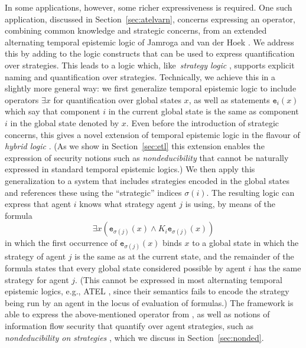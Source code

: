 \documentclass[a4wide]{article}
\theoremstyle{examplesty}
\newcommand{\strat}{\sigma}
\newcommand{\lid}[2]{\mathtt{e}_{#1}(#2)}
\begin{document}
In some 
applications, 
however, some richer expressiveness is required. 
One such application, discussed in Section~\ref{sec:atelvarn},
concerns expressing an operator, combining common knowledge and strategic concerns, 
from an extended alternating temporal epistemic logic of Jamroga and van der Hoek \cite{JvdH2004}.
We address this by 
adding 
to the logic constructs that can be used to express  quantification over strategies.
This leads to a logic which, like~{\em strategy logic} \cite{CHP10,MogaveroMV10}, supports explicit naming and quantification over strategies.
Technically, 
we achieve this in a slightly more general way: we first generalize temporal epistemic logic to include operators 
$\exists x$ for quantification over global states $x$, as well as statements $\lid{i}{x}$ which say that 
component $i$ in the current global state is the same as component $i$ in the global state denoted by $x$. 
Even before the introduction of strategic concerns, this gives a novel extension of temporal epistemic logic 
in the flavour of \emph{hybrid logic} \cite{BS98}. 
(As we show in Section~\ref{sec:etl} this extension enables the expression of 
security notions such as \emph{nondeducibility} \cite{sutherland_86} that cannot be naturally expressed in 
standard temporal epistemic logics.) 
We then apply this generalization to 
a system that includes strategies encoded in the global states and references these using the ``strategic'' 
indices $\sigma(i)$. 
The resulting 
logic can express that agent $i$ knows what strategy agent $j$ is using, by means of the formula 
$$\exists x(\lid{\strat(j)}{x} \land K_i \lid{\strat(j)}{x})$$ 
in which the first occurrence of $\lid{\strat(j)}{x}$ binds $x$ to a global state in which the strategy of agent  $j$ is the same  
as at the current state, and the remainder of the formula states that every global state considered possible by agent $i$ has
the same strategy for agent $j$. (This cannot be expressed in most alternating temporal epistemic logics, e.g., ATEL \cite{ATEL}, 
since their  semantics fails to encode the strategy being run by an agent in the locus of evaluation of formulas.)
The framework 
is able to express the above-mentioned operator from \cite{JvdH2004}, as well as  notions
of information flow security that quantify over agent strategies, such as \emph{nondeducibility on strategies} \cite{WJ90}, 
which we discuss in Section~\ref{sec:nonded}.  
\end{document}
